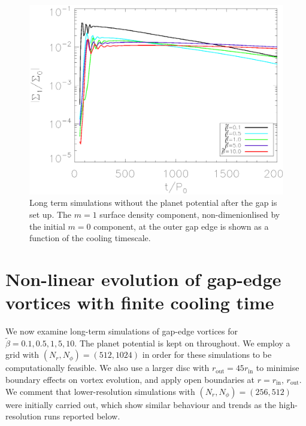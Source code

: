 

\begin{figure}
  \includegraphics[width=\linewidth,clip=true,trim=0.5cm
  0cm 0cm 1.1cm]{figures/longterm_planetoff}
  \caption{Long term simulations without the planet potential after
    the gap is set up. The $m=1$ surface density component,
    non-dimenionlised by the initial $m=0$ component, at the
    outer gap edge is shown as a function of the cooling timescale. 
  } \label{planetofflifetimeplot}
\end{figure}


\section{Non-linear evolution of
  gap-edge vortices with finite cooling time}\label{nonlinear} 
We now examine long-term simulations of gap-edge vortices for
$\tilde{\beta}=0.1,0.5,1,5,10$. The planet potential is kept on
throughout. We employ a grid with $(N_r,N_{\phi})=(512,1024)$ in order
for these 
simulations to be computationally feasible. We also use a larger
disc with $r_{\mathrm{out}}=45r_{\mathrm{in}}$ to minimise boundary
effects on vortex evolution, and apply open boundaries at
$r=r_\mathrm{in},\,r_\mathrm{out}$. We comment that lower-resolution
simulations with $(N_r,N_{\phi})=(256,512)$ were initially carried
out, which show similar behaviour and trends as the high-resolution
runs reported below.   

